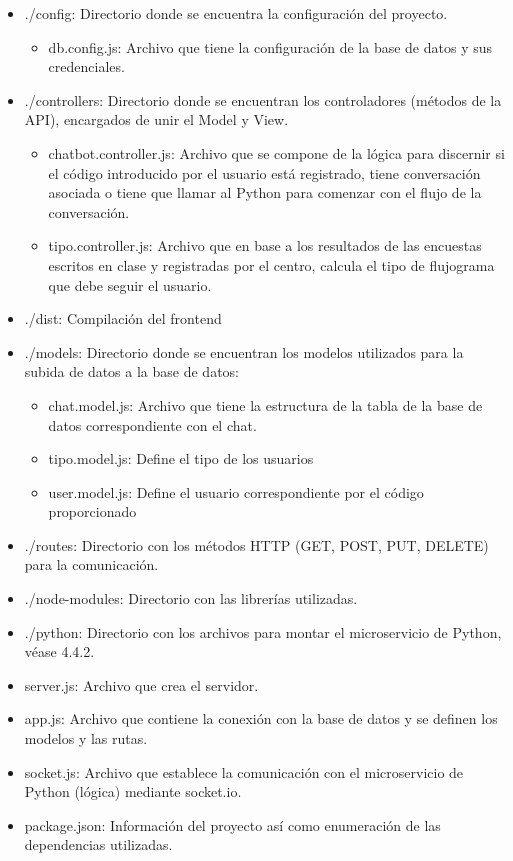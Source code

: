 \begin{itemize}
    \item ./config: Directorio donde se encuentra la configuración del proyecto.
\begin{itemize}
        \item db.config.js: Archivo que tiene la configuración de la base de datos y sus credenciales.
\end{itemize}
    \item ./controllers: Directorio donde se encuentran los controladores (métodos de la API), encargados de unir el Model y View.
\begin{itemize}
        \item chatbot.controller.js: Archivo que se compone de la lógica para discernir si el código introducido por el usuario está registrado, tiene conversación asociada o tiene que llamar al Python para comenzar con el flujo de la conversación.
        \item tipo.controller.js: Archivo que en base a los resultados de las encuestas escritos en clase y registradas por el centro, calcula el tipo de flujograma que debe seguir el usuario.
\end{itemize}
    \item ./dist: Compilación del frontend
    \item ./models: Directorio donde se encuentran los modelos utilizados para la subida de datos a la base de datos:
\begin{itemize}
        \item chat.model.js: Archivo que tiene la estructura de la tabla de la base de datos correspondiente con el chat.
        \item tipo.model.js: Define el tipo de los usuarios
        \item user.model.js: Define el usuario correspondiente por el código proporcionado
\end{itemize}
    \item ./routes: Directorio con los métodos HTTP (GET, POST, PUT, DELETE) para la comunicación.
    \item ./node-modules: Directorio con las librerías utilizadas.
    \item ./python: Directorio con los archivos para montar el microservicio de Python, véase 4.4.2.
    \item server.js: Archivo que crea el servidor.
    \item app.js: Archivo que contiene la conexión con la base de datos y se definen los modelos y las rutas.
    \item socket.js: Archivo que establece la comunicación con el microservicio de Python (lógica) mediante socket.io.
    \item package.json: Información del proyecto así como enumeración de las dependencias utilizadas.
\end{itemize}


